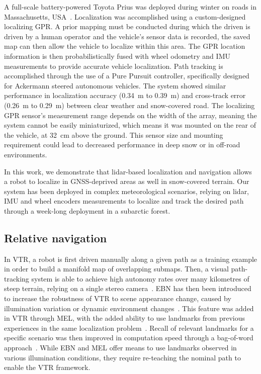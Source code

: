 A full-scale battery-powered Toyota Prius was deployed during winter on roads in Massachusetts, USA~\citep{Ort2020}.
Localization was accomplished using a custom-designed localizing \ac{GPR}. 
A prior mapping must be conducted during which the driven is driven by a human operator and the vehicle's sensor data is recorded, the saved map can then allow the vehicle to localize within this area.
The \ac{GPR} location information is then probabilistically fused with wheel odometry and \ac{IMU} measurements to provide accurate vehicle localization.
Path tracking is accomplished through the use of a Pure Pursuit controller, specifically designed for Ackermann steered autonomous vehicles.
The system showed similar performance in localization accuracy (\SI{0.34}{m} to \SI{0.39}{m}) and cross-track error (\SI{0.26}{m} to \SI{0.29}{m}) between clear weather and snow-covered road.
The localizing \ac{GPR} sensor's measurement range depends on the width of the array, meaning the system cannot be easily miniaturized, which means it was mounted on the rear of the vehicle, at \SI{32}{cm} above the ground.
This sensor size and mounting requirement could lead to decreased performance in deep snow or in off-road environments. 

In this work, we demonstrate that lidar-based localization and navigation allows a robot to localize in \ac{GNSS}-deprived areas as well in snow-covered terrain.
Our system has been deployed in complex meteorological scenarios, relying on lidar, \ac{IMU} and wheel encoders measurements to localize and track the desired path through a week-long deployment in a subarctic forest. 


\subsection{Relative navigation}
\label{rel_nav}


In \ac{VTR}, a robot is first driven manually along a given path as a training example in order to build a manifold map of overlapping submaps. 
Then, a visual path-tracking system is able to achieve high autonomy rates over many kilometres of steep terrain, relying on a single stereo camera~\citep{Furgale2010}. 
\ac{EBN} has then been introduced to increase the robustness of \ac{VTR} to scene appearance change, caused by illumination variation or dynamic environment changes~\citep{Churchill2013}. 
This feature was added in \ac{VTR} through \ac{MEL}, with the added ability to use landmarks from previous experiences in the same localization problem~\citep{Paton2016}.
Recall of relevant landmarks for a specific scenario was then improved in computation speed through a bag-of-word approach~\citep{MacTavish2017}.
While \ac{EBN} and \ac{MEL} offer means to use landmarks observed in various illumination conditions, they require re-teaching the nominal path to enable the \ac{VTR} framework.

